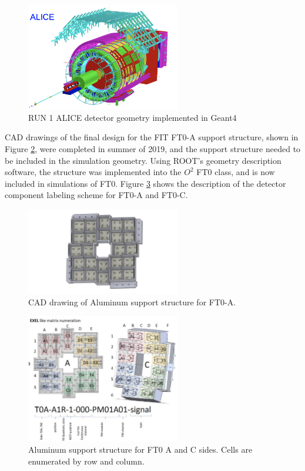\begin{figure}[H]
    \centering
    \includegraphics[width=0.6\textwidth]{figures/ALICE/GEANT_Geometry.png}
    \caption{RUN 1 ALICE detector geometry implemented in Geant4\cite{alice_geant} }
    \label{fig:GEANT_Geometry}
\end{figure}


CAD drawings of the final design for the FIT FT0-A support structure, shown in Figure \ref{fig:FT0_CAD}, were completed in summer of 2019, and the support structure needed to be included in the simulation geometry. Using ROOT's geometry description software, the structure was implemented into the $O^2$ FT0 class, and is now included in simulations of FT0.  Figure \ref{fig:FT0_Labels} shows the description of the detector component labeling scheme for FT0-A and FT0-C.

\begin{figure}[H]
    \centering
    \includegraphics[width=0.6\textwidth]{figures/FIT/FIT_Support_Structure_CAD.pdf}
    \caption{CAD drawing of Aluminum support structure for FT0-A.}
    \label{fig:FT0_CAD}
\end{figure}

\begin{figure}[H]
    \centering
    \includegraphics[width=0.6\textwidth]{figures/FIT/T0_Structure_and_Cell_Numbers.png}
    \caption{Aluminum support structure for FT0 A and C sides. Cells are enumerated by row and column.}
    \label{fig:FT0_Labels}
\end{figure}

